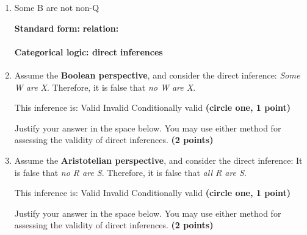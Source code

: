 \documentclass[10pt]{article}
\begin{document}
\begin{enumerate}
  \item Some B are not non-Q 
  
  \textbf{Standard form:}\underline{\hspace{2in}} \textbf{relation:}\underline{\hspace{2in}}




\paragraph{Categorical logic: direct inferences}
  
  
  \item Assume the \textbf{Boolean perspective}, and consider the direct inference: \textit{Some W are X}. Therefore, it is false that \textit{no W are X}.
  
  \vspace{3mm}
  
  This inference is: \hspace{1cm} Valid \hspace{1cm} Invalid \hspace{1cm} Conditionally valid \hspace{1cm} \textbf{(circle one, 1 point)}
  
  \vspace{3mm}
  
  Justify your answer in the space below.  You may use either method for assessing the validity of direct inferences. \textbf{(2 points)}
  
  \vspace{3cm}
  
  \item Assume the \textbf{Aristotelian perspective}, and consider the direct inference: It is false that \textit{no R are S}. Therefore, it is false that \textit{all R are S}.
  
  \vspace{3mm}
  
  This inference is: \hspace{1cm} Valid \hspace{1cm} Invalid \hspace{1cm} Conditionally valid \hspace{1cm} \textbf{(circle one, 1 point)}
  
  \vspace{3mm}
  
  Justify your answer in the space below.  You may use either method for assessing the validity of direct inferences. \textbf{(2 points)}
  

\end{enumerate}
\end{document}
